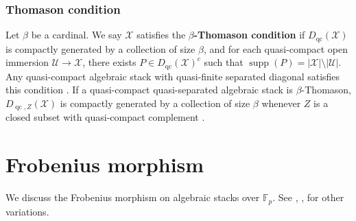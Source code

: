 \documentclass[11pt]{amsart}
\theoremstyle{plain}
\theoremstyle{definition}
\numberwithin{equation}{section}
\numberwithin{theorem}{section}
\begin{document}
\subsubsection{Thomason condition}
\label{sec:prelim_algebraic_stacks_thomason}

Let $\beta$ be a cardinal. 
We say $\mathcal{X}$ satisfies the \textbf{$\beta$-Thomason condition} if $D_{\operatorname{qc}}(\mathcal{X})$ is compactly generated by a collection of size $\beta$, and for each quasi-compact open immersion $\mathcal{U}\to\mathcal{X}$, there exists $P\in D_{\operatorname{qc}}(\mathcal{X})^{c}$ such that $\operatorname{supp}(P)=|\mathcal{X}|\setminus|\mathcal{U}|$. 
Any quasi-compact algebraic stack with quasi-finite separated diagonal satisfies this condition \cite[Theorem A]{Hall/Rydh:2017}. 
If a quasi-compact quasi-separated algebraic stack is $\beta$-Thomason, $D_{\operatorname{qc},Z}(\mathcal{X})$ is compactly generated by a collection of size $\beta$ whenever $Z$ is a closed subset with quasi-compact complement \cite[Lemma 4.10]{Hall/Rydh:2017}.

\section{Frobenius morphism}
\label{sec:finiteness_Frobenii}

We discuss the Frobenius morphism on algebraic stacks over $\mathbb{F}_p$. 
See \cite[Definition 3.1.1]{Olsson:2007}, \cite{Zhang:2024}, \cite{Castorena/Neumann:2024} for other variations.
\end{document}
